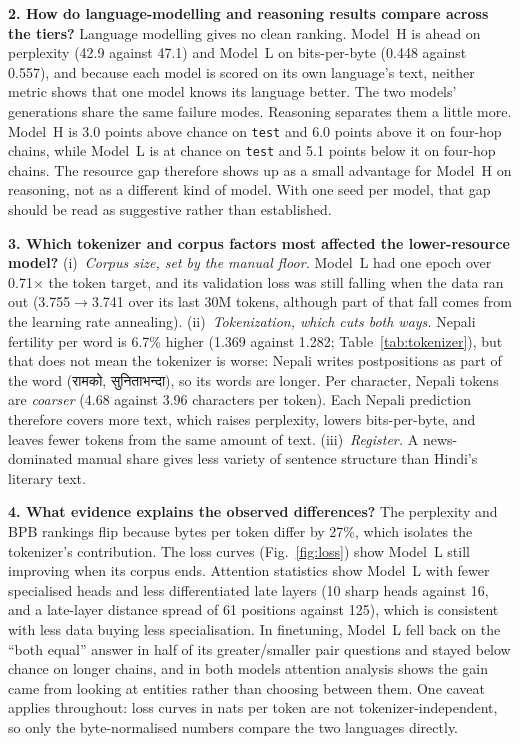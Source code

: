 \documentclass[10pt,a4paper]{article}
\newcommand{\MH}{Model~H}
\newcommand{\ML}{Model~L}
\newcommand{\code}[1]{\texttt{#1}}
\begin{document}
\textbf{2. How do language-modelling and reasoning results compare across the tiers?}
Language modelling gives no clean ranking. \MH{} is ahead on perplexity (42.9 against 47.1) and \ML{} on bits-per-byte (0.448 against 0.557), and because each model is scored on its own language's text, neither metric shows that one model knows its language better. The two models' generations share the same failure modes.
Reasoning separates them a little more. \MH{} is 3.0 points above chance on \code{test} and 6.0 points above it on four-hop chains, while \ML{} is at chance on \code{test} and 5.1 points below it on four-hop chains.
The resource gap therefore shows up as a small advantage for \MH{} on reasoning, not as a different kind of model. With one seed per model, that gap should be read as suggestive rather than established.

\textbf{3. Which tokenizer and corpus factors most affected the lower-resource model?}
(i)~\emph{Corpus size, set by the manual floor.} \ML{} had one epoch over 0.71$\times$ the token target, and its validation loss was still falling when the data ran out (3.755$\to$3.741 over its last 30M tokens, although part of that fall comes from the learning rate annealing).
(ii)~\emph{Tokenization, which cuts both ways.} Nepali fertility per word is 6.7\% higher (1.369 against 1.282; Table~\ref{tab:tokenizer}), but that does not mean the tokenizer is worse: Nepali writes postpositions as part of the word (रामको, सुनिताभन्दा), so its words are longer. Per character, Nepali tokens are \emph{coarser} (4.68 against 3.96 characters per token). Each Nepali prediction therefore covers more text, which raises perplexity, lowers bits-per-byte, and leaves fewer tokens from the same amount of text.
(iii)~\emph{Register.} A news-dominated manual share gives less variety of sentence structure than Hindi's literary text.

\textbf{4. What evidence explains the observed differences?}
The perplexity and BPB rankings flip because bytes per token differ by 27\%, which isolates the tokenizer's contribution.
The loss curves (Fig.~\ref{fig:loss}) show \ML{} still improving when its corpus ends.
Attention statistics show \ML{} with fewer specialised heads and less differentiated late layers (10 sharp heads against 16, and a late-layer distance spread of 61 positions against 125), which is consistent with less data buying less specialisation.
In finetuning, \ML{} fell back on the ``both equal'' answer in half of its greater/smaller pair questions and stayed below chance on longer chains, and in both models attention analysis shows the gain came from looking at entities rather than choosing between them.
One caveat applies throughout: loss curves in nats per token are not tokenizer-independent, so only the byte-normalised numbers compare the two languages directly.
\end{document}
